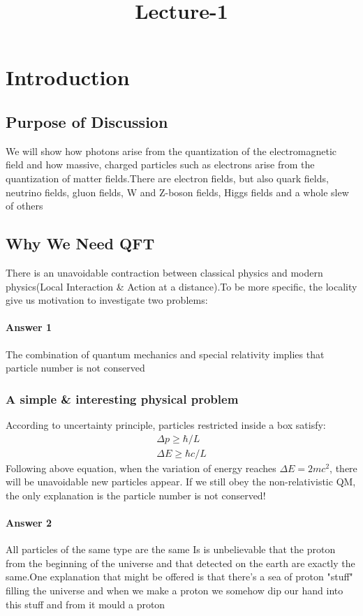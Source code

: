 \documentclass{article}
\title{Lecture-1}
\begin{document}

\section{Introduction}
\subsection{Purpose of Discussion}
\large{We will show how photons arise from the
quantization of the electromagnetic field and how massive, charged particles such as
electrons arise from the quantization of matter fields.There are electron fields,
but also quark fields, neutrino fields, gluon fields, W and Z-boson fields, Higgs fields
and a whole slew of others}
\subsection{Why We Need QFT}
\large{There is an unavoidable contraction between classical physics and modern physics(Local Interaction \& Action at a distance).To be more specific, 
the locality give us motivation to investigate two problems:}

\paragraph{Answer 1}
\large{The combination of quantum mechanics and special relativity
implies that particle number is not conserved}
\subsubsection{A simple \& interesting physical problem}
According to uncertainty principle, particles restricted inside a box satisfy:
\begin{align}\label{uncertainty}
    \Delta p \geq \hbar / L \\
    \Delta E \geq \hbar c / L
\end{align}
Following above equation, when the variation of energy reaches $\Delta E=2 m c^{2}$, there will be unavoidable new particles appear.
If we still obey the non-relativistic QM, the only explanation is the particle number is not conserved!

\paragraph{Answer 2}
\large{All particles of the same type are the same}
Is is unbelievable that the proton from the beginning of the universe and that detected on the 
earth are exactly the same.One explanation that might be offered is that there’s a sea
of proton "stuff" filling the universe and when we make a proton we somehow dip our
hand into this stuff and from it mould a proton
\end{document}
